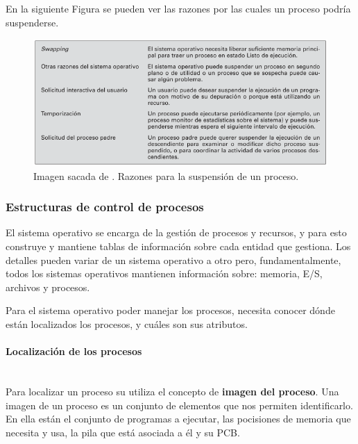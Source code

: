 \documentclass[12pt]{article}
\begin{document}
  En la siguiente Figura se pueden ver las razones por las cuales un proceso podría suspenderse.
  \begin{figure}[H]
    \centering
    \includegraphics[width=\linewidth]{imagenes/suspension-proceso.png}
    \caption{Imagen sacada de \parencite{sostallings}. Razones para la suspensión de un proceso.}
    \label{fig:susp-proceso}
  \end{figure}

  \subsubsection{Estructuras de control de procesos}
  El sistema operativo se encarga de la gestión de procesos y recursos, y para esto construye y mantiene tablas de información sobre cada entidad que gestiona. Los detalles pueden variar de un sistema operativo a otro pero, fundamentalmente, todos los sistemas operativos mantienen información sobre: memoria, E/S, archivos y procesos.

  Para el sistema operativo poder manejar los procesos, necesita conocer dónde están localizados los procesos, y cuáles son sus atributos. 

  \paragraph{Localización de los procesos}\mbox{}\\
  Para localizar un proceso su utiliza el concepto de \textbf{imagen del proceso}. Una imagen de un proceso es un conjunto de elementos que nos permiten identificarlo. En ella están el conjunto de programas a ejecutar, las pocisiones de memoria que necesita y usa, la pila que está asociada a él y su PCB.
  
\end{document}
